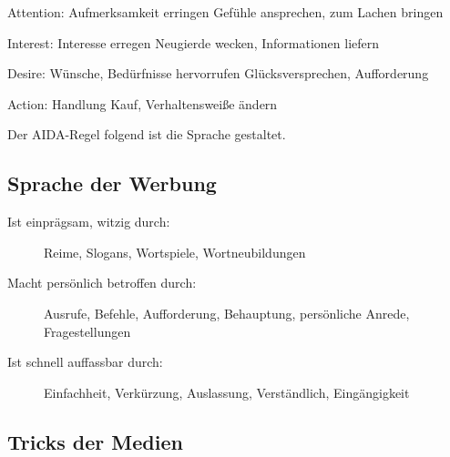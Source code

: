 \begin{eqlist}
	\item[Attention:] Aufmerksamkeit erringen
					\zB Gefühle ansprechen, zum Lachen bringen
	\item[Interest:] Interesse erregen
					\zB Neugierde wecken, Informationen liefern
	\item[Desire:] Wünsche, Bedürfnisse hervorrufen
					\zB Glücksversprechen, Aufforderung
	\item[Action:] Handlung
					\zB Kauf, Verhaltensweiße ändern
\end{eqlist}

Der AIDA-Regel folgend ist die Sprache gestaltet.

\subsection{Sprache der Werbung}
\begin{description}
	\item[Ist einprägsam, witzig durch:] Reime, Slogans, Wortspiele, Wortneubildungen
	\item[Macht persönlich betroffen durch:] Ausrufe, Befehle, Aufforderung, Behauptung, persönliche
		Anrede, Fragestellungen
	\item[Ist schnell auffassbar durch:] Einfachheit, Verkürzung, Auslassung, Verständlich,
		Eingängigkeit
\end{description}


\subsection{Tricks der Medien}
